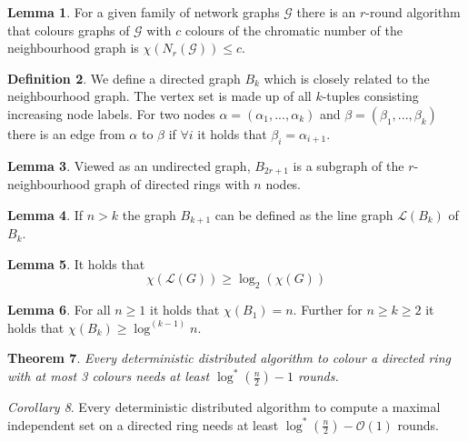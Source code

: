 \documentclass[a4paper, 12pt]{article}
\theoremstyle{plain}
\newtheorem{theorem}{Theorem}[section] %
\theoremstyle{definition}
\newtheorem{definition}[theorem]{Definition} %
\theoremstyle{lemma}
\newtheorem{lemma}[theorem]{Lemma}
\theoremstyle{remark}
\theoremstyle{corollary}
\newtheorem{corollary}[theorem]{Corollary}
\theoremstyle{example}
\begin{document}
	\begin{lemma}
		For a given family of network graphs $\mathcal{G}$ there is an $r$-round algorithm that colours graphs of $\mathcal{G}$ with $c$ colours of the chromatic number of the neighbourhood graph is $\chi(N_r(\mathcal{G})) \leq c$.
	\end{lemma}
	\begin{definition}
		We define a directed graph $B_k$ which is closely related to the neighbourhood graph. The vertex set is made up of all $k$-tuples consisting increasing node labels. For two nodes $\alpha = (\alpha_1, ..., \alpha_k)$ and $\beta = (\beta_1, ..., \beta_k)$ there is an edge from $\alpha$ to $\beta$ if $\forall i$ it holds that $\beta_i = \alpha_{i+1}$.
	\end{definition}
	\begin{lemma}
		Viewed as an undirected graph, $B_{2r+1}$ is a subgraph of the $r$-neighbourhood graph of directed rings with $n$ nodes.
	\end{lemma}
	\begin{lemma}
		If $n>k$ the graph $B_{k+1}$ can be defined as the line graph $\mathcal{L}(B_k)$ of $B_k$.
	\end{lemma}
	\begin{lemma}
		It holds that \[\chi(\mathcal{L}(G)) \geq \log_2(\chi(G))\]
	\end{lemma}
	\begin{lemma}
		For all $n\geq 1$ it holds that $\chi(B_1) = n$. Further for $n\geq k \geq 2$ it holds that $\chi(B_k) \geq \log^{(k-1)} n$.
	\end{lemma}
	\begin{theorem}
		Every deterministic distributed algorithm to colour a directed ring with at most 3 colours needs at least $\log^*(\frac{n}{2}) - 1$ rounds.
	\end{theorem}
	\begin{corollary}
		Every deterministic distributed algorithm to compute a maximal independent set on a directed ring needs at least $\log^*(\frac{n}{2}) - \mathcal{O}(1)$ rounds.
	\end{corollary}
\end{document}
